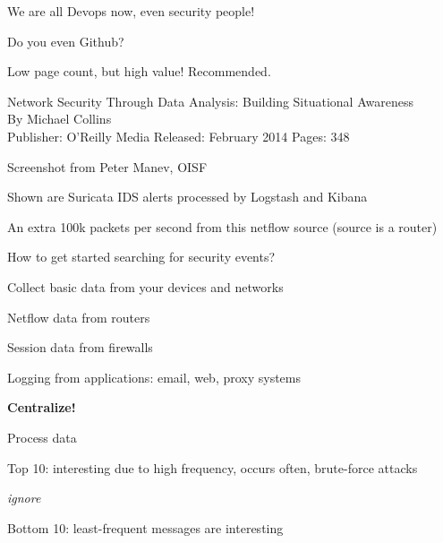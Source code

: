 \documentclass[20pt,landscape,a4paper,footrule]{foils}
\begin{document}
\centerline{We are all Devops now, even security people!}

Do you even Github? \smiley {}



Low page count, but high value! Recommended.

Network Security Through Data Analysis: Building Situational Awareness\\
By Michael Collins\\
Publisher: O'Reilly Media
Released: February 2014 Pages: 348



\vskip 2cm
\begin{list2}
\item Screenshot from Peter Manev, OISF
\item Shown are Suricata IDS alerts processed by Logstash and Kibana
\end{list2}









\centerline{An extra 100k packets per second from this netflow source (source is a router)}



\begin{list1}
\item How to get started searching for security events?
\item Collect basic data from your devices and networks
\begin{list2}
\item Netflow data from routers
\item Session data from firewalls
\item Logging from applications: email, web, proxy systems
\end{list2}
\item {\bf Centralize!}
\item Process data
\begin{list2}
\item Top 10: interesting due to high frequency, occurs often, brute-force attacks
\item {\it ignore}
\item Bottom 10: least-frequent messages are interesting
\end{list2}
\end{list1}
\end{document}
